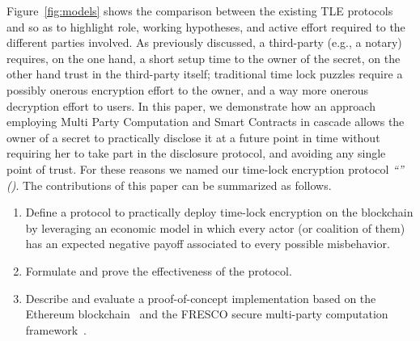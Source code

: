 Figure~\ref{fig:models} shows the comparison between the existing TLE protocols and \shortname so as to highlight role, working hypotheses, and active effort required to the different parties involved. As previously discussed, a third-party (e.g., a notary) requires, on the one hand, a short setup time to the owner of the secret, on the other hand trust in the third-party itself; traditional time lock puzzles require a possibly onerous encryption effort to the owner, and a way more onerous decryption effort to users.
In this paper, we demonstrate how an approach employing Multi Party Computation and Smart Contracts in cascade allows the owner of a secret to practically disclose it at a future point in time without requiring her to take part in the disclosure protocol, and avoiding any single point of trust. For these reasons we named our time-lock encryption protocol {\em``\name'' (\shortname)}.
%
The contributions of this paper can be summarized as follows.

\begin{enumerate}

	\smallskip
 	\item Define a protocol to practically deploy time-lock encryption on the blockchain by leveraging an economic model in which every actor (or coalition of them) has an expected negative payoff associated to every possible misbehavior.
 
 	\smallskip
 	\item Formulate and prove the effectiveness of the protocol.
  
  	\smallskip
 	\item Describe and evaluate a proof-of-concept implementation based on the Ethereum blockchain~\cite{wood2014ethereum} and the FRESCO secure multi-party computation framework~\cite{damgaard2016mpc}.

\end{enumerate}


